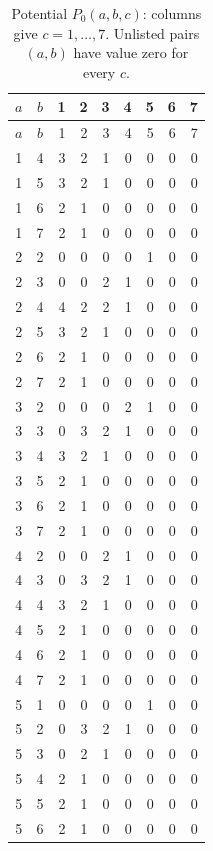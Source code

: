 \begin{center}
\small
\begin{longtable}{ccrrrrrrr}
\caption{Potential $P_0(a,b,c)$: columns give $c=1,\ldots,7$.
Unlisted pairs $(a,b)$ have value zero for every $c$.}\label{tab:potential241}\\
\toprule
$a$ & $b$ & 1 & 2 & 3 & 4 & 5 & 6 & 7\\
\midrule\endfirsthead
\toprule $a$ & $b$ & 1 & 2 & 3 & 4 & 5 & 6 & 7\\\midrule\endhead
1 & 4 & 3 & 2 & 1 & 0 & 0 & 0 & 0\\
1 & 5 & 3 & 2 & 1 & 0 & 0 & 0 & 0\\
1 & 6 & 2 & 1 & 0 & 0 & 0 & 0 & 0\\
1 & 7 & 2 & 1 & 0 & 0 & 0 & 0 & 0\\
2 & 2 & 0 & 0 & 0 & 0 & 1 & 0 & 0\\
2 & 3 & 0 & 0 & 2 & 1 & 0 & 0 & 0\\
2 & 4 & 4 & 2 & 2 & 1 & 0 & 0 & 0\\
2 & 5 & 3 & 2 & 1 & 0 & 0 & 0 & 0\\
2 & 6 & 2 & 1 & 0 & 0 & 0 & 0 & 0\\
2 & 7 & 2 & 1 & 0 & 0 & 0 & 0 & 0\\
3 & 2 & 0 & 0 & 0 & 2 & 1 & 0 & 0\\
3 & 3 & 0 & 3 & 2 & 1 & 0 & 0 & 0\\
3 & 4 & 3 & 2 & 1 & 0 & 0 & 0 & 0\\
3 & 5 & 2 & 1 & 0 & 0 & 0 & 0 & 0\\
3 & 6 & 2 & 1 & 0 & 0 & 0 & 0 & 0\\
3 & 7 & 2 & 1 & 0 & 0 & 0 & 0 & 0\\
4 & 2 & 0 & 0 & 2 & 1 & 0 & 0 & 0\\
4 & 3 & 0 & 3 & 2 & 1 & 0 & 0 & 0\\
4 & 4 & 3 & 2 & 1 & 0 & 0 & 0 & 0\\
4 & 5 & 2 & 1 & 0 & 0 & 0 & 0 & 0\\
4 & 6 & 2 & 1 & 0 & 0 & 0 & 0 & 0\\
4 & 7 & 2 & 1 & 0 & 0 & 0 & 0 & 0\\
5 & 1 & 0 & 0 & 0 & 0 & 1 & 0 & 0\\
5 & 2 & 0 & 3 & 2 & 1 & 0 & 0 & 0\\
5 & 3 & 0 & 2 & 1 & 0 & 0 & 0 & 0\\
5 & 4 & 2 & 1 & 0 & 0 & 0 & 0 & 0\\
5 & 5 & 2 & 1 & 0 & 0 & 0 & 0 & 0\\
5 & 6 & 2 & 1 & 0 & 0 & 0 & 0 & 0\\

\end{longtable}
\end{center}
